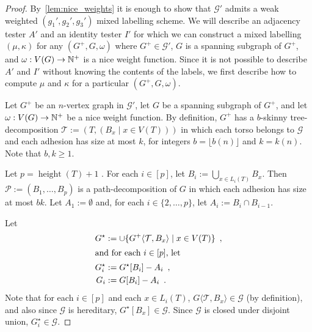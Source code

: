 \documentclass{patmorin}
\renewcommand{\ge}{\geqslant}
\renewcommand{\geq}{\geqslant}
\newcommand{\david}[1]{\noindent{\color{orange} DW: #1}}
\newcommand{\piotr}[1]{\noindent\textcolor{red}{PiMi: #1}}
\newcommand{\torso}[2]{{#1}\langle{#2}\rangle}
\DeclareMathOperator{\height}{height}
\DeclarePairedDelimiter{\set}{\{}{\}}
\begin{document}
  \begin{proof}
    By~\cref{lem:nice_weights} it is enough to show that $\mathcal{G}'$ admits a weak weighted $(g_1',g_2',g_3')$ mixed labelling scheme. We will describe an adjacency tester $A'$ and an identity tester $I'$ for which we can construct a mixed labelling $(\mu,\kappa)$ for any $(G^+,G,\omega)$ where $G^+\in\mathcal{G}'$, $G$ is a spanning subgraph of $G^+$, and $\omega:V(G)\to\mathbb{N}^+$ is a nice weight function.
    Since it is not possible to describe $A'$ and $I'$ without knowing the contents of the labels, we first describe how to compute $\mu$ and $\kappa$ for a particular $(G^+,G,\omega)$.

    Let $G^+$ be an $n$-vertex graph in $\mathcal{G}'$, let $G$ be a spanning subgraph of $G^+$, and let $\omega:V(G)\to\mathbb{N}^+$ be a nice weight function.  By definition, $G^+$ has a $b$-skinny tree-decomposition $\mathcal{T}:=(T,(B_x\mid x\in V(T)))$ in which each torso belongs to $\mathcal{G}$ and each adhesion has size at most $k$, for integers $b =\lfloor b(n)\rfloor$ and $k = k(n)$. Note that $b,k\geq1$.


    Let $p=\height(T)+1$ \david{use := instead of = ?}.
    For each $i\in[p]$, let $B_i:=\bigcup_{x\in L_i(T)} B_x$.  Then $\mathcal{P}:=(B_1,\ldots,B_p)$ is a path-decomposition of $G$ in which each adhesion has size at most $bk$.
    Let $A_1:=\emptyset$ and, for each $i\in\{2,\ldots,p\}$, let $A_i:=B_i\cap B_{i-1}$.

    Let
    \begin{align*}
      G^\star & := \cup\set{\torso{G^+}{\mathcal{T},B_x}\mid x\in V(T)}\enspace,\\
      \intertext{and for each $i\in[p]$, let }
      G^\star_i & := G^\star[B_i]-A_i\enspace, \\
      G_i & := G[B_i]-A_i\enspace.
    \end{align*}
    Note that for each $i\in[p]$ and each $x\in L_i(T)$, $\torso{G}{\mathcal{T},B_x}\in\mathcal{G}$
    (by definition), and also since $\mathcal{G}$ is hereditary, $G^\star[B_x]\in\mathcal{G}$.  Since $\mathcal{G}$ is closed under disjoint union, $G^\star_i\in\mathcal{G}$.



\end{proof}
\end{document}
